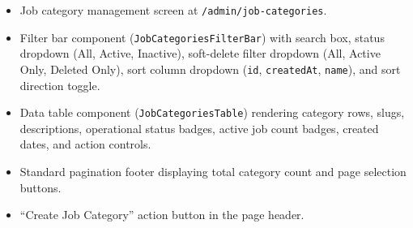 \begin{itemize}[leftmargin=1.6em,topsep=3pt,itemsep=2pt,parsep=0pt,label=$\bullet$]
    \item Job category management screen at \texttt{/admin/job-categories}.
    \item Filter bar component (\texttt{JobCategoriesFilterBar}) with search box, status dropdown (All, Active, Inactive), soft-delete filter dropdown (All, Active Only, Deleted Only), sort column dropdown (\texttt{id}, \texttt{createdAt}, \texttt{name}), and sort direction toggle.
    \item Data table component (\texttt{JobCategoriesTable}) rendering category rows, slugs, descriptions, operational status badges, active job count badges, created dates, and action controls.
    \item Standard pagination footer displaying total category count and page selection buttons.
    \item ``Create Job Category'' action button in the page header.
\end{itemize}

